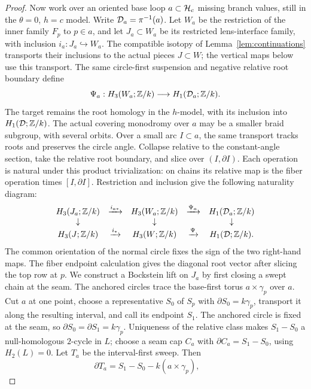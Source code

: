 \begin{proof}
Now work over an oriented base loop \(a\subset\mathcal H_c\) missing
branch values, still in the \(\theta=0\), \(h=c\) model. Write
\(\mathcal D_a=\pi^{-1}(a)\). Let \(W_a\) be the restriction of the inner
family \(F_p\) to \(p\in a\), and let \(J_a\subset W_a\) be its
restricted lens-interface family, with inclusion
\(i_a:J_a\hookrightarrow W_a\). The compatible isotopy of
Lemma~\ref{lem:continuations} transports their inclusions to the actual
pieces \(J\subset W\); the vertical maps below use this transport.
The same circle-first suspension and negative relative root boundary
define
\[
\Psi_a:H_3(W_a;\mathbb Z/k)\longrightarrow H_1(\mathcal D_a;\mathbb Z/k).
\]
The target remains the root homology in the \(h\)-model, with its
inclusion into \(H_1(\mathcal D;\mathbb Z/k)\). The actual covering monodromy
over \(a\) may be a smaller braid subgroup, with several orbits.
Over a small arc
\(I\subset a\), the same transport tracks roots and preserves the
circle angle. Collapse relative to the constant-angle
section, take the relative root boundary, and slice
over \((I,\partial I)\). Each operation is natural
under this product trivialization: on chains its
relative map is the fiber operation times
\([I,\partial I]\). Restriction and inclusion give
the following naturality diagram:
\begin{equation}
\begin{array}{ccccc}
H_3(J_a;\mathbb Z/k)&\xrightarrow{i_{a*}}&H_3(W_a;\mathbb Z/k)
 &\xrightarrow{\Psi_a}&H_1(\mathcal D_a;\mathbb Z/k)\\
\downarrow&&\downarrow&&\downarrow\\
H_3(J;\mathbb Z/k)&\xrightarrow{i_*}&H_3(W;\mathbb Z/k)
 &\xrightarrow{\Psi}&H_1(\mathcal D;\mathbb Z/k).
\end{array}
\label{eq:tube-16}
\end{equation}
The common orientation of the normal circle fixes the
sign of the two right-hand maps. The fiber endpoint
calculation gives the diagonal root vector after
slicing the top row at \(p\).
We construct a Bockstein lift on \(J_a\) by first closing a swept
chain at the seam. The anchored circles trace the base-first torus
\(a\times\gamma_p\) over \(a\). Cut \(a\) at one point, choose a
representative
\(S_0\) of \(S_p\) with \(\partial S_0=k\gamma_p\), transport it
along the resulting interval, and call its endpoint \(S_1\).
The anchored circle is fixed at the seam, so
\(\partial S_0=\partial S_1=k\gamma_p\). Uniqueness of the relative
class makes \(S_1-S_0\) a null-homologous \(2\)-cycle in \(L\);
choose a seam cap \(C_a\) with
\(\partial C_a=S_1-S_0\), using \(H_2(L)=0\).
Let \(T_a\) be the interval-first sweep. Then
\[
 \partial T_a=S_1-S_0-k(a\times\gamma_p),\qquad
\]
\end{proof}
